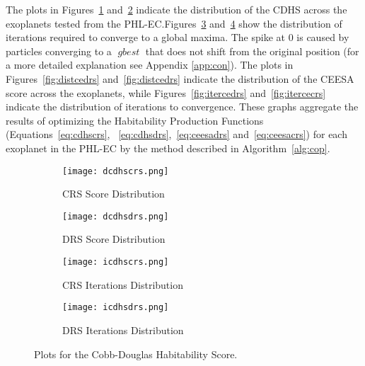 \documentclass[9pt]{article}
\DeclareMathOperator*{\gbest}{\mathit{gbest}}
\begin{document}
The plots in Figures~\ref{fig:distcdcrs} and~\ref{fig:distcddrs} indicate the distribution of the CDHS across the
exoplanets tested from the PHL-EC.\@ Figures~\ref{fig:itercdcrs} and~\ref{fig:itercddrs} show the distribution of
iterations required to converge to a global maxima. The spike at 0 is caused by particles converging to a $\gbest$ that
does not shift from the original position (for a more detailed explanation see Appendix \ref{app:con}). The plots in
Figures~\ref{fig:distcedrs} and~\ref{fig:distcedrs} indicate the distribution of the CEESA score across the exoplanets,
while Figures~\ref{fig:itercedrs} and~\ref{fig:itercecrs} indicate the distribution of iterations to convergence. These
graphs aggregate the results of optimizing the Habitability Production Functions (Equations~\ref{eq:cdhscrs},
~\ref{eq:cdhsdrs},~\ref{eq:ceesadrs} and~\ref{eq:ceesacrs}) for each exoplanet in the PHL-EC by the method described in
Algorithm~\ref{alg:cop}.


\begin{figure}
  \centering
  \begin{subfigure}[b]{0.4\textwidth}
    \texttt{[image: dcdhscrs.png]}
    \caption{CRS Score Distribution}\label{fig:distcdcrs}
  \end{subfigure}
  \quad
  \begin{subfigure}[b]{0.4\textwidth}
    \texttt{[image: dcdhsdrs.png]}
    \caption{DRS Score Distribution}\label{fig:distcddrs}
  \end{subfigure}

  \begin{subfigure}[b]{0.4\textwidth}
    \texttt{[image: icdhscrs.png]}
    \caption{CRS Iterations Distribution}\label{fig:itercdcrs}
  \end{subfigure}
  \quad
  \begin{subfigure}[b]{0.4\textwidth}
    \texttt{[image: icdhsdrs.png]}
    \caption{DRS Iterations Distribution}\label{fig:itercddrs}
  \end{subfigure}
  \caption{Plots for the Cobb-Douglas Habitability Score.}\label{fig:cdhs}
\end{figure}
\end{document}
